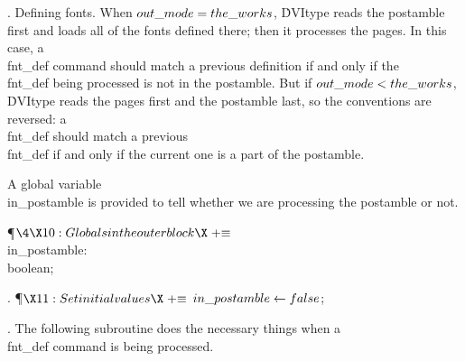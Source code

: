 .  Defining fonts.
When $\\{out\_mode}=\\{the\_works}$, \.{DVItype} reads the postamble first and
loads
all of the fonts defined there; then it processes the pages. In this
case, a \\{fnt\_def} command should match a previous definition if and only
if the \\{fnt\_def} being processed is not in the postamble. But if
$\\{out\_mode}<\\{the\_works}$, \.{DVItype} reads the pages first and the
postamble
last, so the conventions are reversed: a \\{fnt\_def} should match a previous
\\{fnt\_def} if and only if the current one is a part of the postamble.

A global variable \\{in\_postamble} is provided to tell whether we are
processing the postamble or not.

\Y\P$\4\X10:Globals in the outer block\X\mathrel{+}\S$\6
\4\\{in\_postamble}: \\{boolean};\par
\fi

. \P$\X11:Set initial values\X\mathrel{+}\S$\6
$\\{in\_postamble}\gets\\{false}$;\par
\fi

. The following subroutine does the necessary things when a \\{fnt\_def}
command is being processed.

